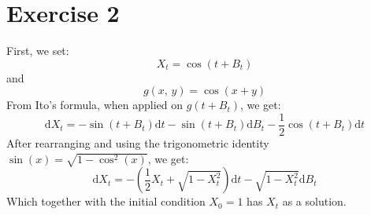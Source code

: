 \documentclass{amsart}
\theoremstyle{plain}
\theoremstyle{definition}
\theoremstyle{definition}
\theoremstyle{remark}
\newcommand{\diff}{\mathrm{d}}
\begin{document}
        \section{Exercise 2}
        First, we set:
        \begin{equation*}
            X_{t} = \cos \left(t + B_{t}\right)
        \end{equation*}
        and
        \begin{equation*}
            g \left(x,\,y\right) = \cos \left(x + y\right)
        \end{equation*}
        From Ito's formula, when applied on \(g \left(t+B_{t}\right)\), we get:
        \begin{equation*}
            \diff  X_{t} = -\sin \left(t + B_{t}\right) \diff t -\sin \left(t + B_{t}\right) \diff  B_{t} - \frac{1}{2} \cos \left(t + B_{t}\right) \diff t
        \end{equation*}
        After rearranging and using the trigonometric identity \(\sin \left(x\right) = \sqrt{1-\cos^{2} \left(x\right)}\), we get:
        \begin{equation*}
            \diff X_{t} = -\left(\frac{1}{2}X_{t}+\sqrt{1-X_{t}^{2}}\right)\diff t - \sqrt{1-X_{t}^{2}}\diff B_{t}
        \end{equation*}
        Which together with the initial condition \(X_{0}=1\) has \(X_{t}\) as a solution.
\end{document}
